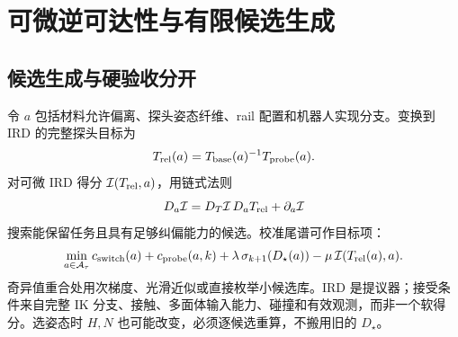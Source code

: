 \documentclass[11pt,a4paper]{article}
\numberwithin{equation}{section}
\theoremstyle{definition}
\begin{document}
\section{可微逆可达性与有限候选生成}
\subsection{候选生成与硬验收分开}
令 $a$ 包括材料允许偏离、探头姿态纤维、rail 配置和机器人实现分支。变换到 IRD 的完整探头目标为
\begin{equation}
 T_{\rm rel}(a)=T_{\rm base}(a)^{-1}T_{\rm probe}(a).
\end{equation}
对可微 IRD 得分 $\mathcal I(T_{\rm rel},a)$，用链式法则
\begin{equation}
 D_a\mathcal I=D_T\mathcal I\,D_aT_{\rm rel}+\partial_a\mathcal I
\end{equation}
搜索能保留任务且具有足够纠偏能力的候选。校准尾谱可作目标项：
\begin{equation}
 \min_{a\in\mathcal A_\tau}
 c_{\rm switch}(a)+c_{\rm probe}(a,k)
 +\lambda\,\sigma_{k+1}(D_\star(a))
 -\mu\,\mathcal I(T_{\rm rel}(a),a).
\end{equation}
奇异值重合处用次梯度、光滑近似或直接枚举小候选库。IRD 是提议器；接受条件来自完整 IK 分支、接触、多面体输入能力、碰撞和有效观测，而非一个软得分。选姿态时 $H,N$ 也可能改变，必须逐候选重算，不搬用旧的 $D_\star$。
\end{document}
